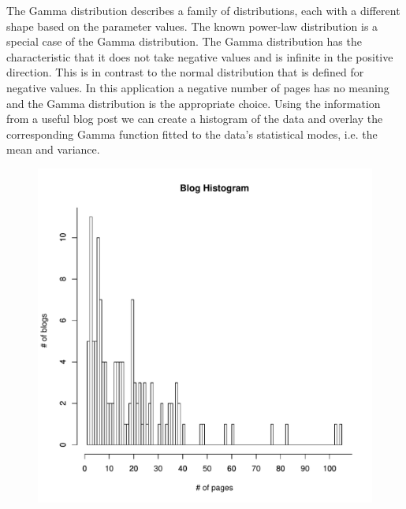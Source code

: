 The Gamma distribution describes a family of distributions, each with a different shape based on the parameter values. The known power-law distribution is a special case of the Gamma distribution. The Gamma distribution has the characteristic that it does not take negative values and is infinite in the positive direction. This is in contrast to the normal distribution that is defined for negative values. In this application a negative number of pages has no meaning and the Gamma distribution is the appropriate choice. Using the information from a useful blog post \cite{Rplots} we can create a histogram of the data and overlay the corresponding Gamma function fitted to the data's statistical modes, i.e. the mean and variance.






\begin{figure}
\centering
\includegraphics[width=.72\textwidth]{../q1/freqHist.pdf}

\end{figure}


